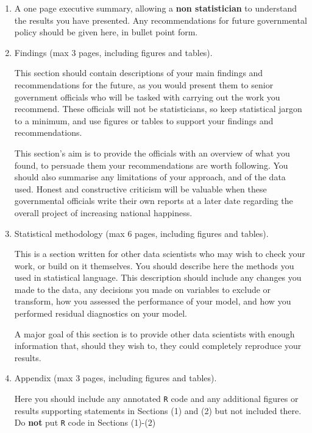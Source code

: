 \documentclass[11pt,a4paper]{article}
\begin{document}
\begin{enumerate}

\item A one page executive summary, allowing a \textbf{non statistician} to understand the results you have presented. Any recommendations for future governmental policy should be given here, in bullet point form.

 \item Findings (max 3 pages, including figures and tables).
 
This section should contain descriptions of your main findings and recommendations for the future, as you would present them to senior government officials who will be tasked with carrying out the work you recommend. These officials will not be statisticians, so keep statistical jargon to a minimum, and use figures or tables to support your findings and recommendations. 
 
This section's aim is to provide the officials with an overview of what you found, to persuade them your recommendations are worth following. You should also summarise any limitations of your approach, and of the data used. Honest and constructive criticism will be valuable when these governmental officials write their own reports at a later date regarding the overall project of increasing national happiness.

 \item Statistical methodology (max 6 pages, including figures and tables). 

 This is a section written for other data scientists who may wish to check your work, or build on it themselves. You should describe here the methods you used in statistical language. This description should include any
 changes you made to the data, any decisions you made on variables to exclude or transform, how you assessed the performance of your model, and how you performed residual diagnostics on your model.

 A major goal of this section is to provide other data scientists with enough information that, should they wish to, they could completely reproduce your results. 

\item Appendix (max 3 pages, including figures and tables).
 
 Here you should include any annotated \texttt{R} code and any additional figures or results supporting statements
in Sections (1) and (2) but not included there.  Do \textbf{not} put  \texttt{R}
code in Sections (1)-(2)

\end{enumerate}
\end{document}
